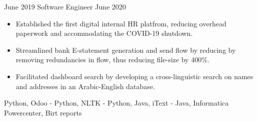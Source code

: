 \begin{experiences}
    \experience
        {June 2019}
        {Software Engineer}
        {}
        {June 2020}
        {
            \begin{itemize}
                \item Established the first digital internal HR platfrom, reducing  overhead paperwork and accommodating the COVID-19 shutdown.
                \item Streamlined bank E-statement generation and send flow by reducing by removing redundancies in flow, thus reducing file-size by 400\%.
                \item Facilitated dashboard search by developing a cross-linguistic search on names and addresses in an Arabic-English database.
            \end{itemize}
        }
        {
            Python,
            Odoo - Python,
            NLTK - Python,
            Java,
            iText - Java,
            Informatica Powercenter,
            Birt reports
        }
\end{experiences}
